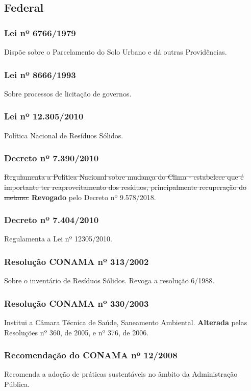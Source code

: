 \begin{subapend}
	\subsection{Federal}
	\begin{subsubapend}
		\item \subsubsection{Lei nº 6766/1979}
		Dispõe sobre o Parcelamento do Solo Urbano e dá outras Providências.
		\subsubsection{Lei nº 8666/1993}
		Sobre processos de licitação de governos.
		\subsubsection{Lei nº 12.305/2010}
		Política Nacional de Resíduos Sólidos.
		\subsubsection{Decreto nº 7.390/2010}
		\sout{Regulamenta a Política Nacional sobre mudança do Clima - estabelece que é importante ter reaproveitamento dos resíduos, principalmente recuperação do metano.}\textbf{ Revogado} pelo Decreto nº 9.578/2018.
		\subsubsection{Decreto nº 7.404/2010}
		Regulamenta a Lei nº 12305/2010.
		\subsubsection{Resolução CONAMA nº 313/2002}
		Sobre o inventário de Resíduos Sólidos. Revoga a resolução 6/1988.
		\subsubsection{Resolução CONAMA nº 330/2003}
		Institui a Câmara Técnica de Saúde, Saneamento Ambiental. \textbf{Alterada} pelas Resoluções nº 360, de 2005, e nº 376, de 2006.
		\subsubsection{Recomendação do CONAMA nº 12/2008}
		Recomenda a adoção de práticas sustentáveis no âmbito da Administração Pública.

\end{subsubapend}
\end{subapend}
